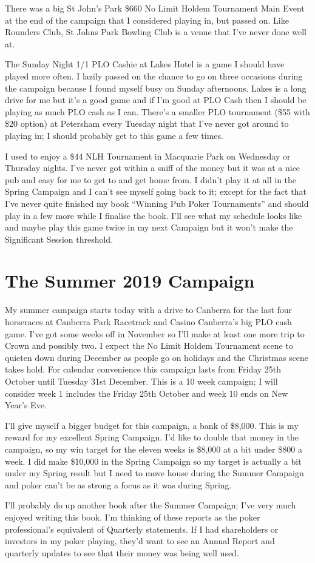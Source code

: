 There was a big St John's Park \$660 No Limit Holdem Tournament Main
Event at the end of the campaign that I considered playing in, but
passed on. Like Rounders Club, St Johns Park Bowling Club is
a venue that I've never done well at.

The Sunday Night 1/1 PLO Cashie at Lakes Hotel is a game I should have
played more often. I lazily passed on the chance to go on three
occasions during the campaign because I found myself busy on Sunday
afternoons. Lakes is a long drive for me but it's a good game and if
I'm good at PLO Cash then I should be playing as much PLO cash as I
can. There's a smaller PLO tournament (\$55 with \$20 option) at
Petersham every Tuesday night that I've never got around to playing
in; I should probably get to this game a few times.

I used to enjoy a \$44 NLH Tournament in Macquarie Park on Wednesday
or Thursday nights. I've never got within a sniff of the money but it
was at a nice pub and easy for me to get to and get home from. I
didn't play it at all in the Spring Campaign and I can't see myself
going back to it; except for the fact that I've never quite finished
my book ``Winning Pub Poker Tournaments'' and should play in a few
more while I finalise the book. I'll see what my schedule looks like
and maybe play this game twice in my next Campaign but it won't make
the Significant Session threshold.

\section*{The Summer 2019 Campaign}

My summer campaign starts today with a drive to Canberra for the
last four horseraces at Canberra Park Racetrack and Casino Canberra's
big PLO cash game. I've got some weeks off in November so I'll make
at least one more trip to Crown and possibly two. I expect the No
Limit Holdem Tournament scene to quieten down during December as
people go on holidays and the Christmas scene takes hold. For calendar
convenience this campaign lasts from Friday 25th October until Tuesday
31st December. This is a 10 week campaign; I will consider week 1
includes the Friday 25th October and week 10 ends on New Year's Eve.

I'll give myself a bigger budget for this campaign, a bank of
\$8,000. This is my reward for my excellent Spring Campaign. I'd like
to double that money in the campaign, so my win target for the eleven
weeks is \$8,000 at a bit under \$800 a week. I did make \$10,000 in
the Spring Campaign so my target is actually a bit under my Spring
result but I need to move house during the Summer Campaign and poker
can't be as strong a focus as it was during Spring.

I'll probably do up another book after the Summer Campaign; I've very
much enjoyed writing this book. I'm thinking of these reports as the
poker professional's equivalent of Quarterly statements. If I had
shareholders or investors in my poker playing, they'd want to see an
Annual Report and quarterly updates to see that their money was being
well used.
